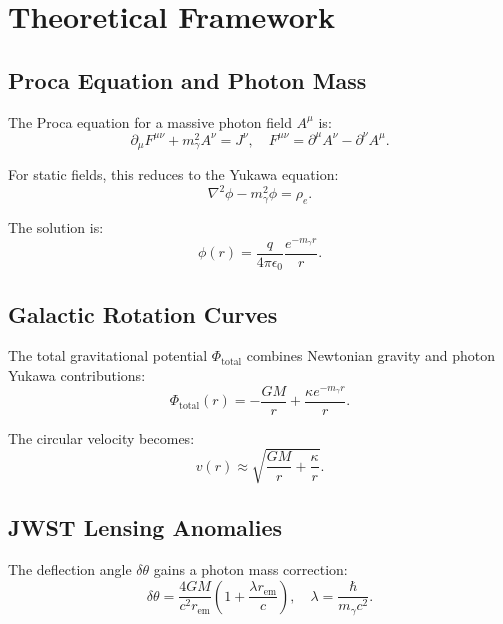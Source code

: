 \documentclass[12pt, a4paper]{article}
\begin{document}
\section{Theoretical Framework}
\label{sec:theory}

\subsection{Proca Equation and Photon Mass}
\label{subsec:proca}

The Proca equation for a massive photon field \( A^\mu \) is:
\begin{equation}
\partial_\mu F^{\mu\nu} + m_\gamma^2 A^\nu = J^\nu, \quad F^{\mu\nu} = \partial^\mu A^\nu - \partial^\nu A^\mu.
\label{eq:proca}
\end{equation}

For static fields, this reduces to the Yukawa equation:
\begin{equation}
\nabla^2 \phi - m_\gamma^2 \phi = \rho_e.
\label{eq:yukawa}
\end{equation}

The solution is:
\begin{equation}
\phi(r) = \frac{q}{4\pi \epsilon_0} \frac{e^{-m_\gamma r}}{r}.
\label{eq:yukawa_sol}
\end{equation}

\subsection{Galactic Rotation Curves}
\label{subsec:rotation}

The total gravitational potential \( \Phi_{\text{total}} \) combines Newtonian gravity and photon Yukawa contributions:
\begin{equation}
\Phi_{\text{total}}(r) = -\frac{GM}{r} + \frac{\kappa e^{-m_\gamma r}}{r}.
\label{eq:total_potential}
\end{equation}

The circular velocity becomes:
\begin{equation}
v(r) \approx \sqrt{\frac{GM}{r} + \frac{\kappa}{r}}.
\label{eq:velocity}
\end{equation}

\subsection{JWST Lensing Anomalies}
\label{subsec:lensing}

The deflection angle \( \delta \theta \) gains a photon mass correction:
\begin{equation}
\delta \theta = \frac{4GM}{c^2 r_{\text{em}}} \left(1 + \frac{\lambda r_{\text{em}}}{c}\right), \quad \lambda = \frac{\hbar}{m_\gamma c^2}.
\label{eq:lensing}
\end{equation}
\end{document}
